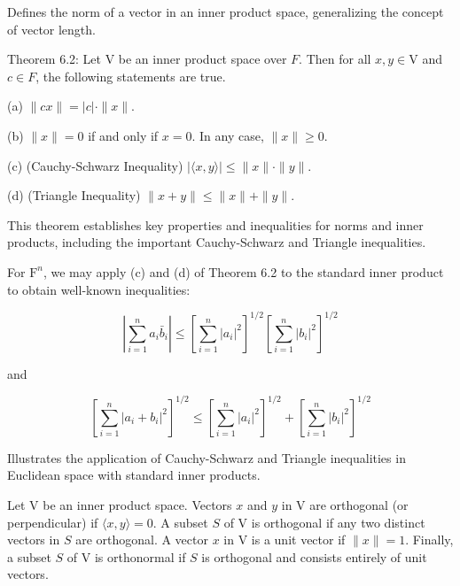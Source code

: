 \documentclass{report}
\begin{document}
    Defines the norm of a vector in an inner product space, generalizing the concept of vector length.


    \begin{thBox}
        Theorem 6.2: Let $\mathrm{V}$ be an inner product space over $F$. Then for all $x, y \in \mathrm{V}$ and $c \in F$, the following statements are true.

        (a) $\|c x\|=|c| \cdot\|x\|$.

        (b) $\|x\|=0$ if and only if $x=0$. In any case, $\|x\| \geq 0$.

        (c) (Cauchy-Schwarz Inequality) $|\langle x, y\rangle| \leq\|x\| \cdot\|y\|$.

        (d) (Triangle Inequality) $\|x+y\| \leq\|x\|+\|y\|$.
    \end{thBox}

    This theorem establishes key properties and inequalities for norms and inner products, including the important Cauchy-Schwarz and Triangle inequalities.


    \begin{Example}
        For $\mathrm{F}^{n}$, we may apply (c) and (d) of Theorem 6.2 to the standard inner product to obtain well-known inequalities:

        \[
        \left|\sum_{i=1}^{n} a_{i} \bar{b}_{i}\right| \leq\left[\sum_{i=1}^{n}\left|a_{i}\right|^{2}\right]^{1 / 2}\left[\sum_{i=1}^{n}\left|b_{i}\right|^{2}\right]^{1 / 2}
        \]

        and

        \[
        \left[\sum_{i=1}^{n}\left|a_{i}+b_{i}\right|^{2}\right]^{1 / 2} \leq\left[\sum_{i=1}^{n}\left|a_{i}\right|^{2}\right]^{1 / 2}+\left[\sum_{i=1}^{n}\left|b_{i}\right|^{2}\right]^{1 / 2}
        \]
    \end{Example}

    Illustrates the application of Cauchy-Schwarz and Triangle inequalities in Euclidean space with standard inner products.


    \begin{defBox}
        Let $\mathrm{V}$ be an inner product space. Vectors $x$ and $y$ in $\mathrm{V}$ are orthogonal (or perpendicular) if $\langle x, y\rangle=0$. A subset $S$ of $\mathrm{V}$ is orthogonal if any two distinct vectors in $S$ are orthogonal. A vector $x$ in $\mathrm{V}$ is a unit vector if $\|x\|=1$. Finally, a subset $S$ of $\mathrm{V}$ is orthonormal if $S$ is orthogonal and consists entirely of unit vectors.
    \end{defBox}
\end{document}
